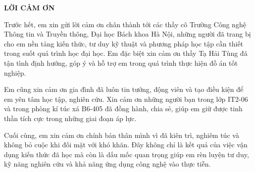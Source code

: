 \documentclass[../DoAn.tex]{subfiles}
\begin{document}
\setlength{\parindent}{1cm}

\begin{center}
\Large{\textbf{LỜI CẢM ƠN}}\\
\end{center}

Trước hết, em xin gửi lời cảm ơn chân thành tới các thầy cô Trường Công nghệ Thông tin và Truyền thông, Đại học Bách khoa Hà Nội, những người đã trang bị cho em nền tảng kiến thức, tư duy kỹ thuật và phương pháp học tập cần thiết trong suốt quá trình học đại học. Em đặc biệt xin cảm ơn thầy Tạ Hải Tùng đã tận tình định hướng, góp ý và hỗ trợ em trong quá trình thực hiện đồ án tốt nghiệp.

Em cũng xin cảm ơn gia đình đã luôn tin tưởng, động viên và tạo điều kiện để em yên tâm học tập, nghiên cứu. Xin cảm ơn những người bạn trong lớp IT2-06 và trong phòng kí túc xá B6-405 đã đồng hành, chia sẻ, giúp em giữ được tinh thần tích cực trong những giai đoạn áp lực.

Cuối cùng, em xin cảm ơn chính bản thân mình vì đã kiên trì, nghiêm túc và không bỏ cuộc khi đối mặt với khó khăn. Đây không chỉ là kết quả của việc vận dụng kiến thức đã học mà còn là dấu mốc quan trọng giúp em rèn luyện tư duy, kỹ năng nghiên cứu và khả năng ứng dụng công nghệ vào thực tiễn.
\end{document}
